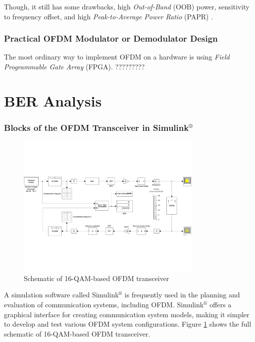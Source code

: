 \documentclass[10pt]{article}
\numberwithin{figure}{section}
\numberwithin{equation}{section}
\begin{document}
Though, it still has some drawbacks, high \textit{Out-of-Band} (OOB) power, sensitivity to frequency offset, and high \textit{Peak-to-Average Power Ratio} (PAPR) \cite{RN81}.

\section{Practical OFDM Modulator or Demodulator Design}
The most ordinary way to implement OFDM on a hardware is using \textit{Field Programmable Gate Array} (FPGA).
?????????


\part{BER Analysis}
\section{Blocks of the OFDM Transceiver in Simulink$^\circledR$}
\begin{figure}[!ht]
    \centering
    \includegraphics[width=0.8\textwidth]{images/simulink.pdf}
    \caption{Schematic of 16-QAM-based OFDM transceiver}
    \label{fig:simulink}
\end{figure}
A simulation software called Simulink$^\circledR$ is frequently used in the planning and evaluation of communication systems, including OFDM. Simulink$^\circledR$ offers a graphical interface for creating communication system models, making it simpler to develop and test various OFDM system configurations. Figure \ref{fig:simulink} shows the full schematic of 16-QAM-based OFDM transceiver.
\end{document}
